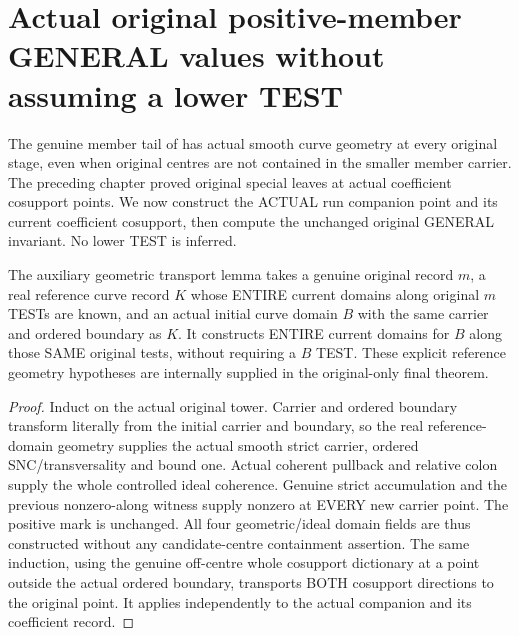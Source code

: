 \section{Actual original positive-member GENERAL values without assuming a lower TEST}

The genuine member tail of \cite[Section~5, Step~I.A]{bierstone-milman08-functoriality}
has actual smooth curve geometry at every original stage, even when original
centres are not contained in the smaller member carrier. The preceding chapter
proved original special leaves at actual coefficient cosupport points. We now
construct the ACTUAL run companion point and its current coefficient cosupport,
then compute the unchanged original GENERAL invariant. No lower TEST is inferred.

\begin{lemma}
\label{hir:original-modeled-untested-curve-domain-offboundary}
\leanok
The auxiliary geometric transport lemma takes a genuine original record $m$,
a real reference curve record $K$ whose ENTIRE current domains along original
$m$ TESTs are known, and an actual initial curve domain $B$ with the same carrier
and ordered boundary as $K$. It constructs ENTIRE current domains for $B$ along
those SAME original tests, without requiring a $B$ TEST. These explicit reference
geometry hypotheses are internally supplied in the original-only final theorem.
\end{lemma}
\begin{proof}
Induct on the actual original tower. Carrier and ordered boundary transform
literally from the initial carrier and boundary, so the real reference-domain
geometry supplies the actual smooth strict carrier, ordered SNC/transversality
and bound one. Actual coherent pullback and relative colon supply the whole
controlled ideal coherence. Genuine strict accumulation and the previous
nonzero-along witness supply nonzero at EVERY new carrier point. The positive
mark is unchanged. All four geometric/ideal domain fields are thus constructed
without any candidate-centre containment assertion. The same induction, using
the genuine off-centre whole cosupport dictionary at a point outside the actual
ordered boundary, transports BOTH cosupport directions to the original point.
It applies independently to the actual companion and its coefficient record.
\end{proof}


